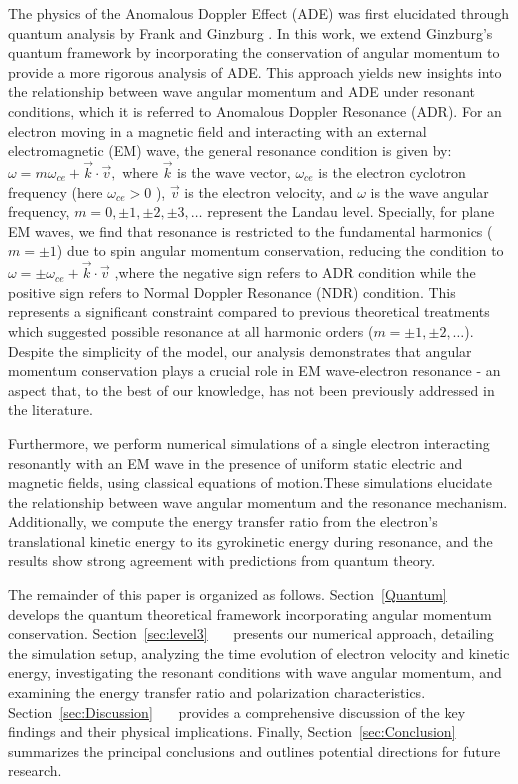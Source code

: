 \documentclass{cpbtex3}
\begin{document}
The physics of the Anomalous Doppler Effect (ADE) was first elucidated through quantum analysis by Frank and Ginzburg \cite{frank1960optics,ginzburg1979nonlinear}. In this work, we extend Ginzburg's quantum framework by incorporating  the conservation of angular momentum to provide a more rigorous analysis of ADE. This approach yields new insights into the relationship between wave angular momentum and ADE under resonant conditions, which it is referred to Anomalous Doppler Resonance (ADR). For an electron moving in a magnetic field and interacting with an external electromagnetic (EM) wave, the general resonance condition is given by:
\(
    \omega = m\omega_{ce} + \vec{k} \cdot \vec{v},
\)
where $\vec{k}$ is the wave vector, $\omega_{ce}$ is the electron cyclotron frequency (here $\omega_{ce}>0$ ), $\vec{v}$ is the electron velocity, and $\omega$ is the wave angular frequency, $m = 0, \pm1, \pm2, \pm3, \ldots$ represent the Landau level\cite{coppi1976slide}. Specially,  for plane EM waves, we find that resonance is restricted to the fundamental harmonics ($m = \pm1$) due to spin angular momentum conservation, reducing the condition to
\(
    \omega = \pm\omega_{ce} + \vec{k} \cdot \vec{v}
\)
,where the negative sign refers to ADR condition while the positive sign refers to Normal Doppler Resonance (NDR) condition. This represents a significant constraint compared to previous theoretical treatments\cite{dendy1987classical} which suggested possible resonance at all harmonic orders ($m = \pm1, \pm2, \dots$).
Despite the  simplicity of the  model, our analysis demonstrates that angular momentum conservation plays a crucial role in EM wave-electron resonance - an aspect that, to the best of our knowledge, has not been previously addressed in the literature.

Furthermore, we perform numerical simulations of a single electron interacting resonantly with an EM wave in the presence of uniform static electric and magnetic fields, using classical equations of motion.These simulations elucidate the relationship between wave angular momentum and the resonance mechanism. Additionally, we compute the energy transfer ratio from the electron’s translational kinetic energy to its gyrokinetic energy during resonance, and the results show strong agreement with predictions from quantum theory.

The remainder of this paper is organized as follows. Section~\ref{Quantum}~~~ develops the quantum theoretical framework incorporating angular momentum conservation. Section~\ref{sec:level3}~~~ presents our numerical approach, detailing the simulation setup, analyzing the time evolution of electron velocity and kinetic energy, investigating the resonant conditions with wave angular momentum, and examining the energy transfer ratio and polarization characteristics. Section~\ref{sec:Discussion}~~~ provides a comprehensive discussion of the key findings and their physical implications. Finally, Section~\ref{sec:Conclusion}~~~ summarizes the principal conclusions and outlines potential directions for future research.
\end{document}
